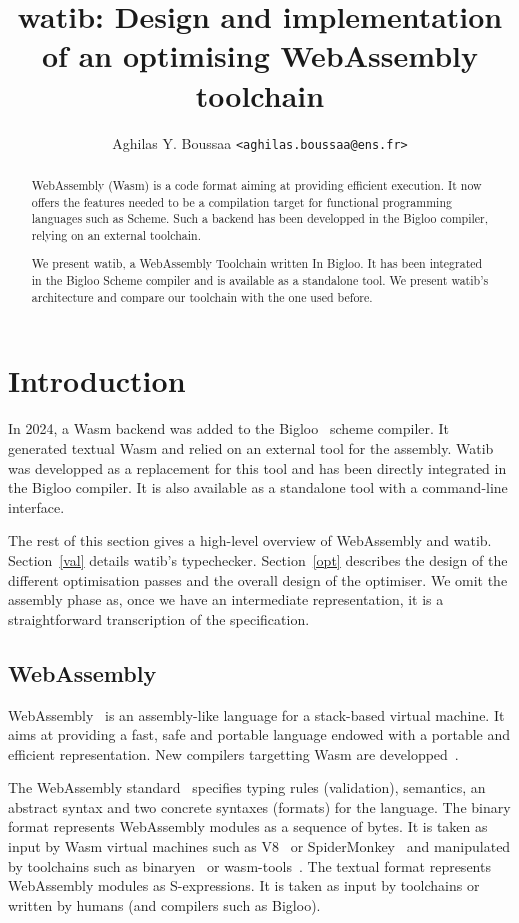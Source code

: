 \documentclass[10pt]{article}
\author{Aghilas Y. Boussaa \texttt{<aghilas.boussaa@ens.fr>}}
\title{\textsf{watib}: Design and implementation of an optimising WebAssembly
  toolchain}
\begin{document}
\maketitle
\begin{abstract}
  WebAssembly (Wasm) is a code format aiming at providing efficient execution.
  It now offers the features needed to be a compilation target for functional
  programming languages such as Scheme. Such a backend has been developped in
  the Bigloo compiler, relying on an external toolchain.

  We present \textsf{watib}, a WebAssembly Toolchain written In Bigloo. It has
  been integrated in the Bigloo Scheme compiler and is available as a standalone
  tool. We present \textsf{watib}'s architecture and compare our toolchain with
  the one used before.
\end{abstract}

\section{Introduction}
In 2024, a Wasm backend was added to the Bigloo~\cite{Bigloo} scheme compiler.
It generated textual Wasm and relied on an external tool for the assembly. Watib
was developped as a replacement for this tool and has been directly integrated
in the Bigloo compiler. It is also available as a standalone tool with a
command-line interface.

The rest of this section gives a high-level overview of WebAssembly and
\textsf{watib}. Section~\ref{val} details \textsf{watib}'s typechecker.
Section~\ref{opt} describes the design of the different optimisation passes and
the overall design of the optimiser. We omit the assembly phase as, once we have
an intermediate representation, it is a straightforward transcription of the
specification.
\subsection{WebAssembly}
WebAssembly~\cite{haas2017bringing} is an assembly-like language for a
stack-based virtual machine. It aims at providing a fast, safe and portable
language endowed with a portable and efficient representation. New compilers
targetting Wasm are developped~\cite{emscripten, kotlin, ocaml}.

The WebAssembly standard~\cite{WebAssemblyCoreSpecification3} specifies typing
rules (validation), semantics, an abstract syntax and two concrete syntaxes
(formats) for the language. The binary format represents WebAssembly modules as
a sequence of bytes. It is taken as input by Wasm virtual machines such as
V8~\cite{V8} or SpiderMonkey~\cite{SpiderMonkey} and manipulated by toolchains
such as binaryen~\cite{Binaryen} or wasm-tools~\cite{WasmTools}. The textual
format represents WebAssembly modules as S-expressions. It is taken as input by
toolchains or written by humans (and compilers such as Bigloo).
\end{document}
